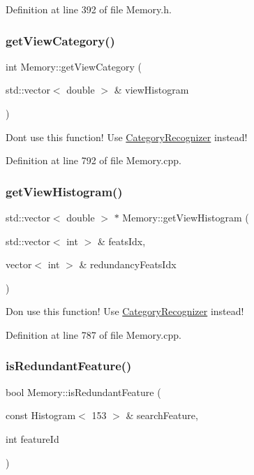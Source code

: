 Definition at line 392 of file Memory.\+h.

\mbox{\label{class_memory_a7be462960a5fa5fdd8ab63dd980a56c2}} 
\subsubsection{\texorpdfstring{get\+View\+Category()}{getViewCategory()}}
{\footnotesize\ttfamily int Memory\+::get\+View\+Category (\begin{DoxyParamCaption}\item[{std\+::vector$<$ double $>$ \&}]{view\+Histogram }\end{DoxyParamCaption})}

Don\textquotesingle{}t use this function! Use \hyperlink{class_category_recognizer}{Category\+Recognizer} instead! 

Definition at line 792 of file Memory.\+cpp.

\mbox{\label{class_memory_a137b4cca30a6eb6bce929f53112cbb40}} 
\subsubsection{\texorpdfstring{get\+View\+Histogram()}{getViewHistogram()}}
{\footnotesize\ttfamily std\+::vector$<$ double $>$ $\ast$ Memory\+::get\+View\+Histogram (\begin{DoxyParamCaption}\item[{std\+::vector$<$ int $>$ \&}]{feats\+Idx,  }\item[{vector$<$ int $>$ \&}]{redundancy\+Feats\+Idx }\end{DoxyParamCaption})}

Don use this function! Use \hyperlink{class_category_recognizer}{Category\+Recognizer} instead! 

Definition at line 787 of file Memory.\+cpp.

\mbox{\label{class_memory_ae520566ff0cd3b122c0773825141f567}} 
\subsubsection{\texorpdfstring{is\+Redundant\+Feature()}{isRedundantFeature()}}
{\footnotesize\ttfamily bool Memory\+::is\+Redundant\+Feature (\begin{DoxyParamCaption}\item[{const Histogram$<$ 153 $>$ \&}]{search\+Feature,  }\item[{int}]{feature\+Id }\end{DoxyParamCaption})}

